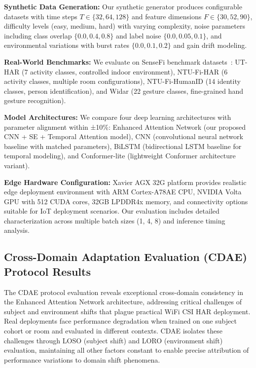 \documentclass[journal]{IEEEtran}
\begin{document}
\textbf{Synthetic Data Generation:} Our synthetic generator produces configurable datasets with time steps $T \in \{32, 64, 128\}$ and feature dimensions $F \in \{30, 52, 90\}$, difficulty levels (easy, medium, hard) with varying complexity, noise parameters including class overlap $\{0.0, 0.4, 0.8\}$ and label noise $\{0.0, 0.05, 0.1\}$, and environmental variations with burst rates $\{0.0, 0.1, 0.2\}$ and gain drift modeling.

\textbf{Real-World Benchmarks:} We evaluate on SenseFi benchmark datasets~\cite{yang2023sensefi}: UT-HAR (7 activity classes, controlled indoor environment), NTU-Fi-HAR (6 activity classes, multiple room configurations), NTU-Fi-HumanID (14 identity classes, person identification), and Widar (22 gesture classes, fine-grained hand gesture recognition).

\textbf{Model Architectures:} We compare four deep learning architectures with parameter alignment within ±10\%: Enhanced Attention Network (our proposed CNN + SE + Temporal Attention model), CNN (convolutional neural network baseline with matched parameters), BiLSTM (bidirectional LSTM baseline for temporal modeling), and Conformer-lite (lightweight Conformer architecture variant).

\textbf{Edge Hardware Configuration:} Xavier AGX 32G platform provides realistic edge deployment environment with ARM Cortex-A78AE CPU, NVIDIA Volta GPU with 512 CUDA cores, 32GB LPDDR4x memory, and connectivity options suitable for IoT deployment scenarios. Our evaluation includes detailed characterization across multiple batch sizes (1, 4, 8) and inference timing analysis.

\subsection{Cross-Domain Adaptation Evaluation (CDAE) Protocol Results}

The CDAE protocol evaluation reveals exceptional cross-domain consistency in the Enhanced Attention Network architecture, addressing critical challenges of subject and environment shifts that plague practical WiFi CSI HAR deployment. Real deployments face performance degradation when trained on one subject cohort or room and evaluated in different contexts. CDAE isolates these challenges through LOSO (subject shift) and LORO (environment shift) evaluation, maintaining all other factors constant to enable precise attribution of performance variations to domain shift phenomena.
\end{document}
